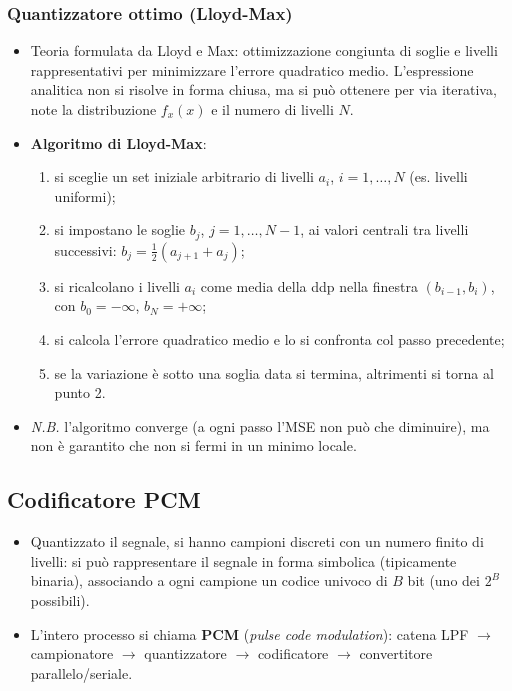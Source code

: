 \documentclass[12pt, a4paper]{article}
\begin{document}
\subsubsection{Quantizzatore ottimo (Lloyd-Max)}
\begin{itemize}
    \item Teoria formulata da Lloyd e Max: ottimizzazione congiunta di soglie e livelli rappresentativi per minimizzare l'errore quadratico medio. L'espressione analitica non si risolve in forma chiusa, ma si può ottenere per via iterativa, note la distribuzione $f_x(x)$ e il numero di livelli $N$.
    \item \textbf{Algoritmo di Lloyd-Max}:
    \begin{enumerate}
        \item si sceglie un set iniziale arbitrario di livelli $a_i$, $i=1,\dots,N$ (es. livelli uniformi);
        \item si impostano le soglie $b_j$, $j=1,\dots,N-1$, ai valori centrali tra livelli successivi: $b_j=\frac12(a_{j+1}+a_j)$;
        \item si ricalcolano i livelli $a_i$ come media della ddp nella finestra $(b_{i-1},b_i)$, con $b_0=-\infty$, $b_N=+\infty$;
        \item si calcola l'errore quadratico medio e lo si confronta col passo precedente;
        \item se la variazione è sotto una soglia data si termina, altrimenti si torna al punto 2.
    \end{enumerate}
    \item[] \textit{N.B.} l'algoritmo converge (a ogni passo l'MSE non può che diminuire), ma non è garantito che non si fermi in un minimo locale.
\end{itemize}

\subsection{Codificatore PCM}
\begin{itemize}
    \item Quantizzato il segnale, si hanno campioni discreti con un numero finito di livelli: si può rappresentare il segnale in forma simbolica (tipicamente binaria), associando a ogni campione un codice univoco di $B$ bit (uno dei $2^B$ possibili).
    \item L'intero processo si chiama \textbf{PCM} (\textit{pulse code modulation}): catena LPF $\to$ campionatore $\to$ quantizzatore $\to$ codificatore $\to$ convertitore parallelo/seriale.
\end{itemize}
\end{document}
